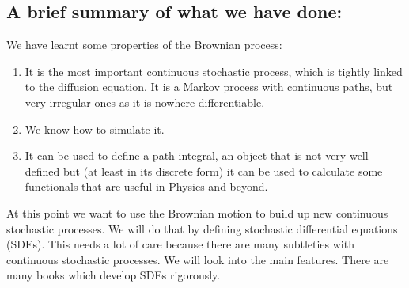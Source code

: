 \subsection*{A brief summary of what we have done:}
We have learnt some properties of the Brownian process:
\begin{enumerate}
  \item It is the most important continuous stochastic process, which is tightly
    linked to the diffusion equation. It is a Markov process with continuous
    paths, but very irregular ones as it is nowhere differentiable.
  \item We know how to simulate it.
  \item It can be used to define a path integral, an object that is not very
    well defined but (at least in its discrete form) it can be used to calculate
    some functionals that are useful in Physics and beyond.
\end{enumerate}

At this point we want to use the Brownian motion to build up new continuous
stochastic processes. We will do that by defining stochastic differential
equations (SDEs). This needs a lot of care because there are many subtleties
with continuous stochastic processes. We will look into the main features. There
are many books which develop SDEs rigorously.